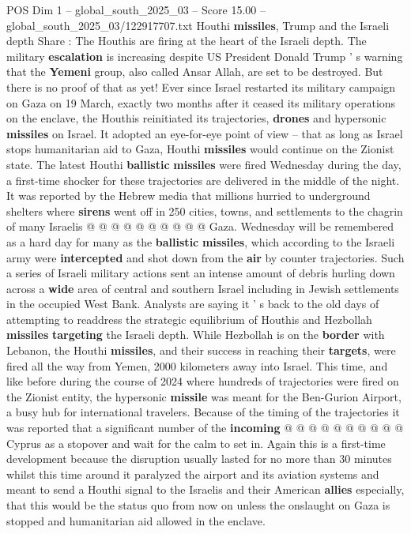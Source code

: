 \begin{textsample}{POS Dim 1 – global\_south\_2025\_03 – Score 15.00 – global\_south\_2025\_03/122917707.txt}  \label{ex:f1_pos_298}
Houthi \textbf{missiles}, Trump and the Israeli depth Share : The Houthis are firing at the heart of the Israeli depth.
The military \textbf{escalation} is increasing despite US President Donald Trump ' s warning that the \textbf{Yemeni} group, also called Ansar Allah, are set to be destroyed.
But there is no proof of that as yet!
Ever since Israel restarted its military campaign on Gaza on 19 March, exactly two months after it ceased its military operations on the enclave, the Houthis reinitiated its trajectories, \textbf{drones} and hypersonic \textbf{missiles} on Israel.
It adopted an eye-for-eye point of view -- that as long as Israel stops humanitarian aid to Gaza, Houthi \textbf{missiles} would continue on the Zionist state.
The latest Houthi \textbf{ballistic} \textbf{missiles} were fired Wednesday during the day, a first-time shocker for these trajectories are delivered in the middle of the night.
It was reported by the Hebrew media that millions hurried to underground shelters where \textbf{sirens} went off in 250 cities, towns, and settlements to the chagrin of many Israelis @ @ @ @ @ @ @ @ @ @ Gaza.
Wednesday will be remembered as a hard day for many as the \textbf{ballistic} \textbf{missiles}, which according to the Israeli army were \textbf{intercepted} and shot down from the \textbf{air} by counter trajectories.
Such a series of Israeli military actions sent an intense amount of debris hurling down across a \textbf{wide} area of central and southern Israel including in Jewish settlements in the occupied West Bank.
Analysts are saying it ' s back to the old days of attempting to readdress the strategic equilibrium of Houthis and Hezbollah \textbf{missiles} \textbf{targeting} the Israeli depth.
While Hezbollah is on the \textbf{border} with Lebanon, the Houthi \textbf{missiles}, and their success in reaching their \textbf{targets}, were fired all the way from Yemen, 2000 kilometers away into Israel.
This time, and like before during the course of 2024 where hundreds of trajectories were fired on the Zionist entity, the hypersonic \textbf{missile} was meant for the Ben-Gurion Airport, a busy hub for international travelers.
Because of the timing of the trajectories it was reported that a significant number of the \textbf{incoming} @ @ @ @ @ @ @ @ @ @ Cyprus as a stopover and wait for the calm to set in.
Again this is a first-time development because the disruption usually lasted for no more than 30 minutes whilst this time around it paralyzed the airport and its aviation systems and meant to send a Houthi signal to the Israelis and their American \textbf{allies} especially, that this would be the status quo from now on unless the onslaught on Gaza is stopped and humanitarian aid allowed in the enclave.

\end{textsample}
